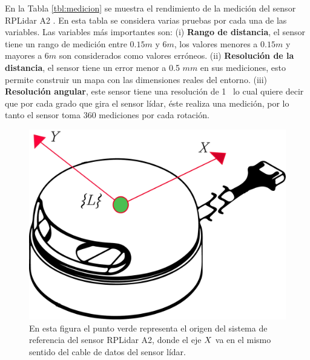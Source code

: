 En la Tabla \ref{tbl:medicion} se muestra el rendimiento de la medición del 
sensor RPLidar A2 \cite{Slamtec}. En esta tabla se considera varias pruebas 
por cada una de las variables. Las variables más importantes son: (i) 
\textbf{Rango de distancia}, el sensor tiene un rango de medición entre $0.15 
m$ y $6 m$, los valores menores a $0.15 m$ y mayores a $6 m$ son 
considerados como valores erróneos. (ii) \textbf{Resolución de la 
distancia}, el sensor tiene un error menor a 0.5 $mm$ en sus mediciones, esto 
permite construir un mapa con las dimensiones reales del entorno. (iii) 
\textbf{Resolución angular}, este sensor tiene una resolución de 1\grad~ lo cual 
quiere decir que por cada grado que gira el sensor lídar, éste realiza una medición, 
por lo tanto el sensor toma 360 mediciones por cada rotación.

\begin{figure}
	\centering \footnotesize
	\includegraphics[width=0.40\linewidth]{images/frame_laser.png}
	\captionsetup{font=footnotesize}
	\caption{En esta figura el punto verde representa el origen del sistema de referencia 
	del sensor RPLidar A2, donde el eje $\mathnormal X$ va en el mismo sentido del cable 
	de datos del sensor lídar.}
	\label{fig:FrameLidar}
\end{figure}

